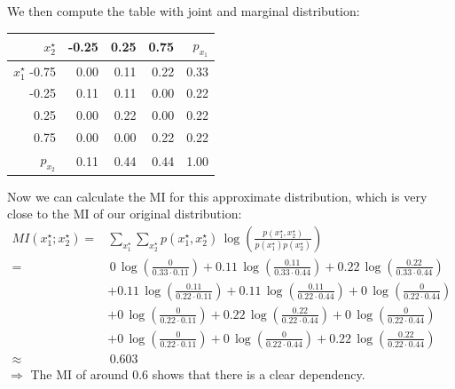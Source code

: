 {\begin{enumerate}[a)]
  We then compute the table with joint and marginal distribution: 
  \begin{table}[H]
  	\centering
  	\begin{tabular}{r|rrr|r}
  		\hline
  		$x_2^\star$ & -0.25 & 0.25 & 0.75 & $p_{x_1}$ \\ 
  		\hline
  		$x_1^\star$ \hspace*{0.2cm} -0.75 & 0.00 & 0.11 & 0.22 & 0.33 \\ 
  		-0.25 & 0.11 & 0.11 & 0.00 & 0.22 \\ 
  		0.25 & 0.00 & 0.22 & 0.00 & 0.22 \\ 
  		0.75 & 0.00 & 0.00 & 0.22 & 0.22 \\
  		\hline 
  		$p_{x_2}$& 0.11 & 0.44 & 0.44 & 1.00 \\ 
  		\hline
  	\end{tabular}
  \end{table}
Now we can calculate the MI for this approximate distribution, which is very close to the MI of our original distribution: 
   \begin{align*}
   	MI(x_1^\star ; x_2^\star) = & \sum_{x_1^\star} \sum_{x_2^\star} p(x_1^\star, x_2^\star) \, \log\left(\frac{p(x_1^\star, x_2^\star)}{p(x_1^\star) p(x_2^\star)} \right)\\
 	= & \,0\, \log\left(\frac{0}{0.33 \cdot 0.11} \right) 
   	+ 0.11\, \log\left(\frac{0.11}{0.33 \cdot 0.44} \right) 
   	+ 0.22\, \log\left(\frac{0.22}{0.33 \cdot 0.44} \right) \\
   	& + 0.11\, \log\left(\frac{0.11}{0.22 \cdot 0.11} \right)
   	+ 0.11\, \log\left(\frac{0.11}{0.22 \cdot 0.44} \right) 
   	+ 0\, \log\left(\frac{0}{0.22 \cdot 0.44} \right) \\
   	& + 0\, \log\left(\frac{0}{0.22 \cdot 0.11} \right)
   	+ 0.22\, \log\left(\frac{0.22}{0.22 \cdot 0.44} \right) 
   	+ 0\, \log\left(\frac{0}{0.22 \cdot 0.44} \right) \\
   	& + 0\, \log\left(\frac{0}{0.22 \cdot 0.11} \right)
   	+ 0\, \log\left(\frac{0}{0.22 \cdot 0.44} \right) 
   	+ 0.22\, \log\left(\frac{0.22}{0.22 \cdot 0.44} \right) \\
   	\approx & \, 0.603
   \end{align*}
$\Rightarrow$
The MI of around 0.6 shows that there is a clear dependency.

\end{enumerate}
}
